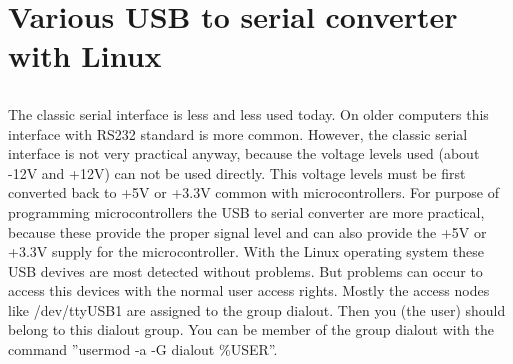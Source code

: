 \chapter{Various USB to serial converter with Linux}

\section*{}
The classic serial interface is less and less used today.
On older computers this interface with RS232 standard is more common.
However, the classic serial interface is not very practical anyway, because
the voltage levels used (about -12V and +12V) can not be used directly.
This voltage levels must be first converted back to +5V or +3.3V common with
microcontrollers. 
For purpose of programming microcontrollers the USB to serial converter are
more practical, because these provide the proper signal level and can
also provide the +5V or +3.3V supply for the microcontroller.
With the Linux operating system these USB devives are most detected without problems.
But problems can occur to access this devices with the normal user access rights.
Mostly the access nodes like /dev/ttyUSB1 are assigned to the group dialout.
Then you (the user) should belong to this dialout group.
You can be member of the group dialout with the command ''usermod -a -G dialout \%USER''.


